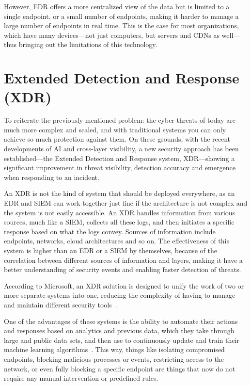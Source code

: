 \documentclass[12pt,a4paper]{report}
\begin{document}
However, EDR offers a more centralized view of the data but is limited to a single endpoint, or
a small number of endpoints, making it harder to manage a large number of endpoints in real time.
This is the case for most organizations, which have many devices---not just computers, but
servers and CDNs as well---thus bringing out the limitations of this technology.

\section{Extended Detection and Response (XDR)}

To reiterate the previously mentioned problem: the cyber threats of today are much more complex
and scaled, and with traditional systems you can only achieve so much protection against them. On
these grounds, with the recent developments of AI and cross-layer visibility, a new security
approach has been established---the Extended Detection and Response system, XDR---showing a
significant improvement in threat visibility, detection accuracy and emergence when responding to
an incident.

An XDR is not the kind of system that should be deployed everywhere, as an EDR and SIEM can work
together just fine if the architecture is not complex and the system is not easily accessible.
An XDR handles information from various sources, much like a SIEM, collects all these logs, and
then initiates a specific response based on what the logs convey. Sources of information include
endpoints, networks, cloud architectures and so on. The effectiveness of this system is higher
than an EDR or a SIEM by themselves, because of the correlation between different sources of
information and layers, making it have a better understanding of security events and enabling
faster detection of threats.

According to Microsoft, an XDR solution is designed to unify the work of two or more separate
systems into one, reducing the complexity of having to manage and maintain different security
tools~\cite{ref5}.

One of the advantages of these systems is the ability to automate their actions and responses
based on analytics and previous data, which they take through large and public data sets, and
then use to continuously update and train their machine learning algorithms~\cite{ref6}. This
way, things like isolating compromised endpoints, blocking malicious processes or events,
restricting access to the network, or even fully blocking a specific endpoint are things that now
do not require any manual intervention or predefined rules.
\end{document}
